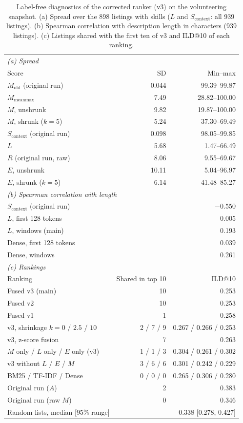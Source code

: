 \documentclass[CHICAGO]{USG}
\begin{document}
\begin{table}[!t]
\caption{Label-free diagnostics of the corrected ranker (v3) on the volunteering snapshot. (a) Spread over the 898 listings with skills ($L$ and $S_{\mathrm{context}}$: all 939 listings). (b) Spearman correlation with description length in characters (939 listings). (c) Listings shared with the first ten of v3 and ILD@10 of each ranking.}
\label{tab:labelfree}
\centering
\footnotesize
\begin{tabular}{lrr}
\toprule
\multicolumn{3}{l}{\emph{(a) Spread}} \\
Score & SD & Min--max \\
\midrule
$M_{\mathrm{old}}$ (original run) & 0.044 & 99.39--99.87 \\
$M_{\mathrm{meanmax}}$ & 7.49 & 28.82--100.00 \\
$M$, unshrunk & 9.82 & 19.87--100.00 \\
$M$, shrunk ($k=5$) & 5.24 & 37.30--69.49 \\
$S_{\mathrm{context}}$ (original run) & 0.098 & 98.05--99.85 \\
$L$ & 5.68 & 1.47--66.49 \\
$R$ (original run, raw) & 8.06 & 9.55--69.67 \\
$E$, unshrunk & 10.11 & 5.04--96.97 \\
$E$, shrunk ($k=5$) & 6.14 & 41.48--85.27 \\
\midrule
\multicolumn{3}{l}{\emph{(b) Spearman correlation with length}} \\
\midrule
$S_{\mathrm{context}}$ (original run) & \multicolumn{2}{r}{$-0.550$} \\
$L$, first 128 tokens & \multicolumn{2}{r}{0.005} \\
$L$, windows (main) & \multicolumn{2}{r}{0.193} \\
Dense, first 128 tokens & \multicolumn{2}{r}{0.039} \\
Dense, windows & \multicolumn{2}{r}{0.261} \\
\midrule
\multicolumn{3}{l}{\emph{(c) Rankings}} \\
Ranking & Shared in top 10 & ILD@10 \\
\midrule
Fused v3 (main) & 10 & 0.253 \\
Fused v2 & 10 & 0.253 \\
Fused v1 & 1 & 0.258 \\
v3, shrinkage $k=0$ / $2.5$ / $10$ & 2 / 7 / 9 & 0.267 / 0.266 / 0.253 \\
v3, z-score fusion & 7 & 0.263 \\
$M$ only / $L$ only / $E$ only (v3) & 1 / 1 / 3 & 0.304 / 0.261 / 0.302 \\
v3 without $L$ / $E$ / $M$ & 3 / 6 / 6 & 0.301 / 0.242 / 0.229 \\
BM25 / TF-IDF / Dense & 0 / 0 / 0 & 0.265 / 0.306 / 0.280 \\
Original run ($A$) & 2 & 0.383 \\
Original run (raw $M$) & 0 & 0.346 \\
Random lists, median [95\% range] & --- & 0.338 [0.278, 0.427] \\
\bottomrule
\end{tabular}
\end{table}
\end{document}
